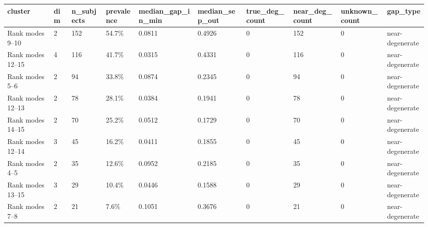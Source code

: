 \begin{tabular}{llllllllll}
\toprule
cluster & dim & n\_subjects & prevalence & median\_gap\_in\_min & median\_sep\_out & true\_deg\_count & near\_deg\_count & unknown\_count & gap\_type \\
\midrule
Rank modes 9--10 & 2 & 152 & 54.7\% & 0.0811 & 0.4926 & 0 & 152 & 0 & near-degenerate \\
Rank modes 12--15 & 4 & 116 & 41.7\% & 0.0315 & 0.4331 & 0 & 116 & 0 & near-degenerate \\
Rank modes 5--6 & 2 & 94 & 33.8\% & 0.0874 & 0.2345 & 0 & 94 & 0 & near-degenerate \\
Rank modes 12--13 & 2 & 78 & 28.1\% & 0.0384 & 0.1941 & 0 & 78 & 0 & near-degenerate \\
Rank modes 14--15 & 2 & 70 & 25.2\% & 0.0512 & 0.1729 & 0 & 70 & 0 & near-degenerate \\
Rank modes 12--14 & 3 & 45 & 16.2\% & 0.0411 & 0.1855 & 0 & 45 & 0 & near-degenerate \\
Rank modes 4--5 & 2 & 35 & 12.6\% & 0.0952 & 0.2185 & 0 & 35 & 0 & near-degenerate \\
Rank modes 13--15 & 3 & 29 & 10.4\% & 0.0446 & 0.1588 & 0 & 29 & 0 & near-degenerate \\
Rank modes 7--8 & 2 & 21 & 7.6\% & 0.1051 & 0.3676 & 0 & 21 & 0 & near-degenerate \\
\bottomrule
\end{tabular}
